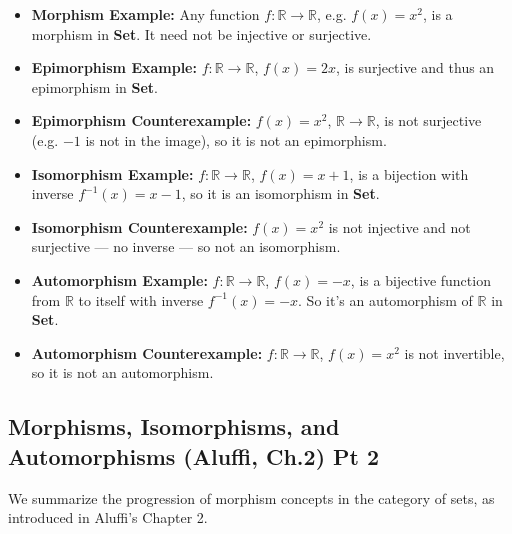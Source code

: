 \documentclass[10pt]{article}
\theoremstyle{plain}
\theoremstyle{definition}
\begin{document}
\begin{itemize}
	\item \textbf{Morphism Example:} Any function \( f: \mathbb{R} \to \mathbb{R} \), e.g. \( f(x) = x^2 \), is a morphism in \textbf{Set}. It need not be injective or surjective.
	
	\item \textbf{Epimorphism Example:} \( f: \mathbb{R} \to \mathbb{R} \), \( f(x) = 2x \), is surjective and thus an epimorphism in \textbf{Set}.
	
	\item \textbf{Epimorphism Counterexample:} \( f(x) = x^2 \), \( \mathbb{R} \to \mathbb{R} \), is not surjective (e.g. \( -1 \) is not in the image), so it is not an epimorphism.
	
	\item \textbf{Isomorphism Example:} \( f: \mathbb{R} \to \mathbb{R} \), \( f(x) = x + 1 \), is a bijection with inverse \( f^{-1}(x) = x - 1 \), so it is an isomorphism in \textbf{Set}.
	
	\item \textbf{Isomorphism Counterexample:} \( f(x) = x^2 \) is not injective and not surjective — no inverse — so not an isomorphism.
	
	\item \textbf{Automorphism Example:} \( f: \mathbb{R} \to \mathbb{R} \), \( f(x) = -x \), is a bijective function from \( \mathbb{R} \) to itself with inverse \( f^{-1}(x) = -x \). So it's an automorphism of \( \mathbb{R} \) in \textbf{Set}.
	
	\item \textbf{Automorphism Counterexample:} \( f: \mathbb{R} \to \mathbb{R} \), \( f(x) = x^2 \) is not invertible, so it is not an automorphism.
\end{itemize}


\subsection*{Morphisms, Isomorphisms, and Automorphisms (Aluffi, Ch.2) Pt 2}

We summarize the progression of morphism concepts in the category of sets, as introduced in Aluffi’s Chapter 2.
\end{document}
